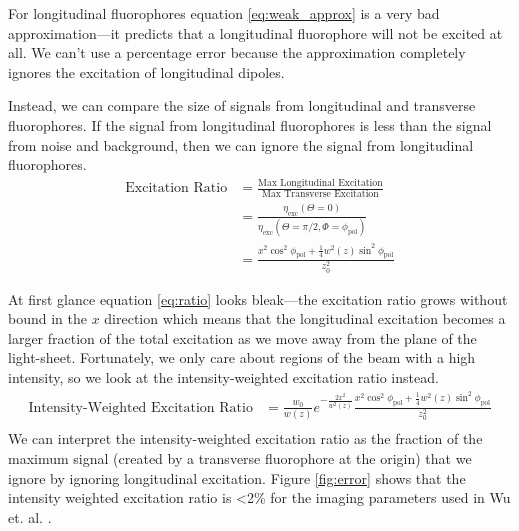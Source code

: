 \documentclass[11pt]{article}
\begin{document}
For longitudinal fluorophores equation \ref{eq:weak_approx} is a very bad
approximation---it predicts that a longitudinal fluorophore will not be excited
at all. We can't use a percentage error because the approximation completely
ignores the excitation of longitudinal dipoles.

Instead, we can compare the size of signals from longitudinal and transverse
fluorophores. If the signal from longitudinal fluorophores is less than the
signal from noise and background, then we can ignore the signal from
longitudinal fluorophores.
\begin{align}
  \text{Excitation Ratio} &= \frac{\text{Max Longitudinal Excitation}}{\text{Max Transverse Excitation}}\\
                          &= \frac{\eta_{\text{exc}}(\Theta = 0)}{\eta_{\text{exc}}(\Theta = \pi/2, \Phi = \phi_{\text{pol}})}\\
                          &= \frac{x^2\cos^2\phi_{\text{pol}} + \frac{1}{4}w^2(z)\sin^2\phi_{\text{pol}}}{z_0^2}\label{eq:ratio}
\end{align}

At first glance equation \ref{eq:ratio} looks bleak---the excitation ratio grows
without bound in the $x$ direction which means that the longitudinal excitation
becomes a larger fraction of the total excitation as we move away from the plane
of the light-sheet. Fortunately, we only care about regions of the beam with a
high intensity, so we look at the intensity-weighted excitation ratio instead.
\begin{align*}
    \text{Intensity-Weighted Excitation Ratio} &= \frac{w_0}{w(z)}e^{-\frac{2x^2}{w^2(z)}}\frac{x^2\cos^2\phi_{\text{pol}} + \frac{1}{4}w^2(z)\sin^2\phi_{\text{pol}}}{z_0^2}\label{eq:intratio} \\
\end{align*}
We can interpret the intensity-weighted excitation ratio as the fraction of the
maximum signal (created by a transverse fluorophore at the origin) that we
ignore by ignoring longitudinal excitation. Figure \ref{fig:error} shows that
the intensity weighted excitation ratio is \textless 2\% for the imaging parameters used
in Wu et. al. \cite{wu2013}.

\end{document}
